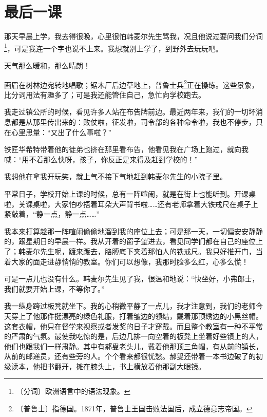 \documentclass[12pt,UTF-8,openany]{ctexbook}
\begin{document}
\chapter{最后一课}

\begin{normalsize}
    
    那天早晨上学，我去得很晚，心里很怕韩麦尔先生骂我，况且他说过要问我们分词\footnote{〔分词〕欧洲语言中的语法现象。}，可是我连一个字也说不上来。我想就别上学了，到野外去玩玩吧。
    
    天气那么暖和，那么晴朗！
    
    画眉在树林边宛转地唱歌；锯木厂后边草地上，普鲁士兵\footnote{〔普鲁士〕指德国。1871年，普鲁士王国击败法国后，成立德意志帝国。}正在操练。这些景象，比分词用法有趣多了；可是我还能管住自己，急忙向学校跑去。
    
    我走过镇公所的时候，看见许多人站在布告牌前边。最近两年来，我们的一切坏消息都是从那里传出来的：败仗啦，征发啦，司令部的各种命令啦，我也不停步，只在心里思量：“又出了什么事啦？”
    
    铁匠华希特带着他的徒弟也挤在那里看布告，他看见我在广场上跑过，就向我喊：“用不着那么快呀，孩子，你反正是来得及赶到学校的！”
    
    我想他在拿我开玩笑，就上气不接下气地赶到韩麦尔先生的小院子里。
    
    平常日子，学校开始上课的时候，总有一阵喧闹，就是在街上也能听到。开课桌啦，关课桌啦，大家怕吵捂着耳朵大声背书啦……还有老师拿着大铁戒尺在桌子上紧敲着，“静一点，静一点……”
    
    我本来打算趁那一阵喧闹偷偷地溜到我的座位上去；可是那一天，一切偏安安静静的，跟星期日的早晨一样。我从开着的窗子望进去，看见同学们都在自己的座位上了；韩麦尔先生呢，踱来踱去，胳膊底下夹着那怕人的铁戒尺。我只好推开门，当着大家的面走进静悄悄的教室。你们可以想像，我那时脸多么红，心多么慌！
    
    可是一点儿也没有什么。韩麦尔先生见了我，很温和地说：“快坐好，小弗郎士，我们就要开始上课，不等你了。”
    
    我一纵身跨过板凳就坐下。我的心稍微平静了一点儿，我才注意到，我们的老师今天穿上了他那件挺漂亮的绿色礼服，打着皱边的领结，戴着那顶绣边的小黑丝帽。这套衣帽，他只在督学来视察或者发奖的日子才穿戴。而且整个教室有一种不平常的严肃的气氛。最使我吃惊的是，后边几排一向空着的板凳上坐着好些镇上的人，他们也跟我们一样肃静。其中有郝叟老头儿，戴着他那顶三角帽，有从前的镇长，从前的邮递员，还有些旁的人。个个看来都很忧愁。郝叟还带着一本书边破了的初级读本，他把书翻开，摊在膝头上，书上横放着他那副大眼镜。
    

\end{normalsize}
\end{document}
